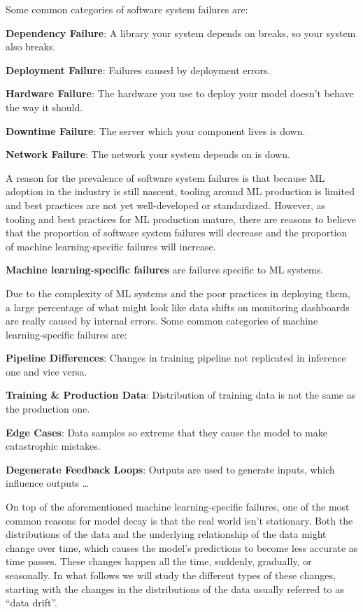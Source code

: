 Some common categories of software system failures are:
\bit
\item \textbf{Dependency Failure}: A library your system depends on breaks, so your system also breaks.
\item \textbf{Deployment Failure}: Failures caused by deployment errors.
\item \textbf{Hardware Failure}: The hardware you use to deploy your model doesn't behave the way it should.
\item \textbf{Downtime Failure}: The server which your component lives is down.
\item \textbf{Network Failure}: The network your system depends on is down.
\eit

A reason for the prevalence of software system failures is that because ML adoption in the industry is still nascent,
tooling around ML production is limited and best practices are not yet well-developed or standardized. However, as
tooling and best practices for ML production mature, there are reasons to believe that the proportion of software
system failures will decrease and the proportion of machine learning-specific failures will increase.

\textbf{Machine learning-specific failures} are failures specific to ML systems.
\ed

Due to the complexity of ML systems and the poor practices in deploying them, a large percentage of what might look
like data shifts on monitoring dashboards are really caused by internal errors. Some common categories of machine
learning-specific failures are:
\bit
\item \textbf{Pipeline Differences}: Changes in training pipeline not replicated in inference one and vice versa.
\item \textbf{Training \& Production Data}: Distribution of training data is not the same as the production one.
\item \textbf{Edge Cases}: Data samples so extreme that they cause the model to make catastrophic mistakes.
\item \textbf{Degenerate Feedback Loops}: Outputs are used to generate inputs, which influence outputs \ldots
\eit

On top of the aforementioned machine learning-specific failures, one of the most common reasons for model decay is
that the real world isn't stationary. Both the distributions of the data and the underlying relationship of the data
might change over time, which causes the model's predictions to become less accurate as time passes. These changes
happen all the time, suddenly, gradually, or seasonally. In what follows we will study the different types of these
changes, starting with the changes in the distributions of the data usually referred to as ``data drift''.

